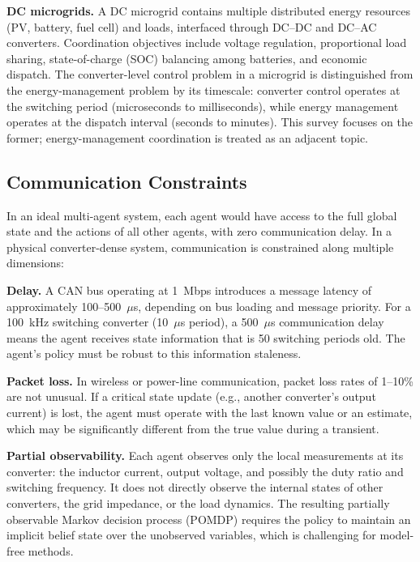 \documentclass[manuscript,screen,review]{acmart}
\begin{document}
\textbf{DC microgrids.}
A DC microgrid contains multiple distributed energy resources (PV, battery, fuel cell) and loads, interfaced through DC--DC and DC--AC converters.
Coordination objectives include voltage regulation, proportional load sharing, state-of-charge (SOC) balancing among batteries, and economic dispatch.
The converter-level control problem in a microgrid is distinguished from the energy-management problem by its timescale: converter control operates at the switching period (microseconds to milliseconds), while energy management operates at the dispatch interval (seconds to minutes).
This survey focuses on the former; energy-management coordination is treated as an adjacent topic.

\subsection{Communication Constraints}

In an ideal multi-agent system, each agent would have access to the full global state and the actions of all other agents, with zero communication delay.
In a physical converter-dense system, communication is constrained along multiple dimensions:

\textbf{Delay.}
A CAN bus operating at 1~Mbps introduces a message latency of approximately 100--500~$\mu$s, depending on bus loading and message priority.
For a 100~kHz switching converter (10~$\mu$s period), a 500~$\mu$s communication delay means the agent receives state information that is 50 switching periods old.
The agent's policy must be robust to this information staleness.

\textbf{Packet loss.}
In wireless or power-line communication, packet loss rates of 1--10\% are not unusual.
If a critical state update (e.g., another converter's output current) is lost, the agent must operate with the last known value or an estimate, which may be significantly different from the true value during a transient.

\textbf{Partial observability.}
Each agent observes only the local measurements at its converter: the inductor current, output voltage, and possibly the duty ratio and switching frequency.
It does not directly observe the internal states of other converters, the grid impedance, or the load dynamics.
The resulting partially observable Markov decision process (POMDP) requires the policy to maintain an implicit belief state over the unobserved variables, which is challenging for model-free methods.
\end{document}
